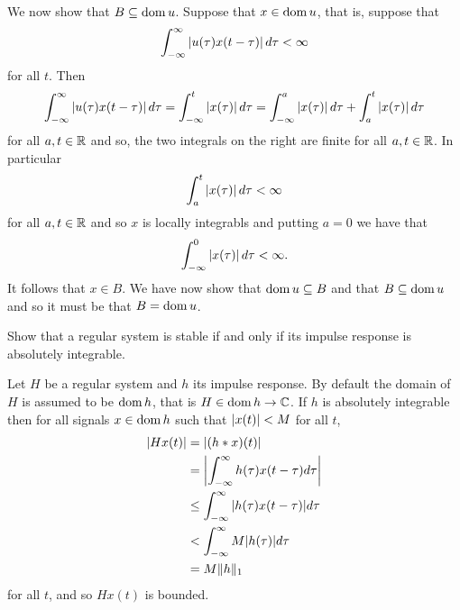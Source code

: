 \begin{excersizelist}
\begin{solution}
We now show that $B \subseteq \operatorname{dom} u$.  Suppose that $x \in \operatorname{dom} u$, that is, suppose that
\[
\int_{-\infty}^{\infty} \left\vert u(\tau) x(t - \tau) \right\vert d\tau < \infty
\]
for all $t$.  Then
\[
\int_{-\infty}^{\infty} \left\vert u(\tau) x(t - \tau) \right\vert d\tau = \int_{-\infty}^{t} \left\vert x(\tau) \right\vert d\tau = \int_{-\infty}^{a} \left\vert x(\tau) \right\vert d\tau + \int_{a}^{t} \left\vert x(\tau) \right\vert d\tau
\]
for all $a, t \in {\mathbb R}$ and so, the two integrals on the right are finite for all $a,t \in {\mathbb R}$.  In particular
\[
\int_{a}^{t} \left\vert x(\tau) \right\vert d\tau < \infty
\]
for all $a, t \in {\mathbb R}$ and so $x$ is locally integrabls and putting $a = 0$ we have that
\[
\int_{-\infty}^{0} \left\vert x(\tau) \right\vert d\tau < \infty.
\]
It follows that $x \in B$.  We have now show that $\operatorname{dom} u \subseteq B$ and that $B \subseteq \operatorname{dom} u$ and so it must be that $B = \operatorname{dom} u$.
\end{solution} 


\item \label{excer:bibostableimpulseresp} Show that a regular system is stable if and only if its impulse response is absolutely integrable.
\begin{solution}
Let $H$ be a regular system and $h$ its impulse response.  By default the domain of $H$ is assumed to be $\operatorname{dom} h$, that is $H \in \operatorname{dom} h \to {\mathbb C}$.  If $h$ is absolutely integrable then for all signals $x \in \operatorname{dom} h$ such that $\vert x(t) \vert < M$ for all $t$,
\begin{align*}
\left\vert H x(t) \right\vert &= \left\vert (h * x)(t) \right\vert \\
&= \left\vert \int_{-\infty}^\infty h(\tau)  x(t - \tau) d\tau \right\vert \\
&\leq \int_{-\infty}^\infty \vert h(\tau) x(t - \tau) \vert d\tau \\
&< \int_{-\infty}^\infty M \vert h(\tau) \vert d\tau \\
&= M \|h\|_1
\end{align*}
for all $t$, and so $H x(t)$ is bounded.  


\end{solution}
\end{excersizelist}
